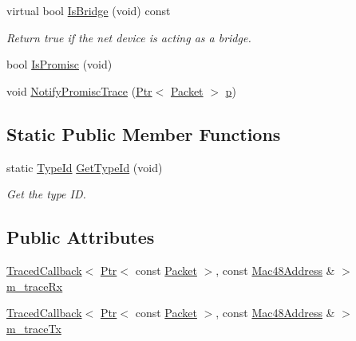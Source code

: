 \begin{DoxyCompactItemize}
virtual bool \hyperlink{classns3_1_1WimaxNetDevice_aa6c47d753b4171fe54454fb8e5d81eba}{Is\+Bridge} (void) const 
\begin{DoxyCompactList}\small\item\em Return true if the net device is acting as a bridge. \end{DoxyCompactList}\item 
bool \hyperlink{classns3_1_1WimaxNetDevice_a723428fe404a97984ad511200ac124cb}{Is\+Promisc} (void)
\item 
void \hyperlink{classns3_1_1WimaxNetDevice_ae4b47a15b76b910b8e91e70f1afd6fbc}{Notify\+Promisc\+Trace} (\hyperlink{classns3_1_1Ptr}{Ptr}$<$ \hyperlink{classns3_1_1Packet}{Packet} $>$ \hyperlink{lte__link__budget__x2__handover__measures_8m_ac9de518908a968428863f829398a4e62}{p})
\end{DoxyCompactItemize}
\subsection*{Static Public Member Functions}
\begin{DoxyCompactItemize}
\item 
static \hyperlink{classns3_1_1TypeId}{Type\+Id} \hyperlink{classns3_1_1WimaxNetDevice_a284c4ec1e399010085c056f9306b285e}{Get\+Type\+Id} (void)
\begin{DoxyCompactList}\small\item\em Get the type ID. \end{DoxyCompactList}\end{DoxyCompactItemize}
\subsection*{Public Attributes}
\begin{DoxyCompactItemize}
\item 
\hyperlink{classns3_1_1TracedCallback}{Traced\+Callback}$<$ \hyperlink{classns3_1_1Ptr}{Ptr}$<$ const \hyperlink{classns3_1_1Packet}{Packet} $>$, const \hyperlink{classns3_1_1Mac48Address}{Mac48\+Address} \& $>$ \hyperlink{classns3_1_1WimaxNetDevice_a88710ac8dd5cdcee795372c5722be86e}{m\+\_\+trace\+Rx}
\item 
\hyperlink{classns3_1_1TracedCallback}{Traced\+Callback}$<$ \hyperlink{classns3_1_1Ptr}{Ptr}$<$ const \hyperlink{classns3_1_1Packet}{Packet} $>$, const \hyperlink{classns3_1_1Mac48Address}{Mac48\+Address} \& $>$ \hyperlink{classns3_1_1WimaxNetDevice_a8fcb2352790f8cc4b34adbb1a359fa97}{m\+\_\+trace\+Tx}
\end{DoxyCompactItemize}
